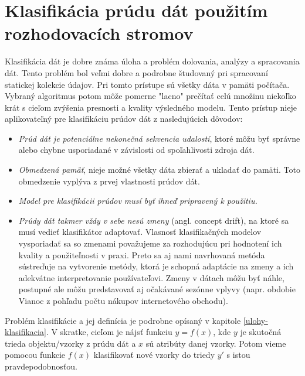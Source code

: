 \chapter{Klasifikácia prúdu dát použitím rozhodovacích stromov}
\label{Klasifikácia prúdu dát použitím rozhodovacích stromov}


Klasifikácia dát je dobre známa úloha a problém dolovania, analýzy a spracovania dát. Tento problém bol veľmi dobre a podrobne študovaný pri spracovaní statickej kolekcie údajov. Pri tomto prístupe sú všetky dáta v pamäti počítača. Vybraný algoritmus potom môže pomerne "lacno" prečítať celú množinu niekoľko krát s cieľom zvýšenia presnosti a kvality výsledného modelu. Tento prístup nieje aplikovateľný pre klasifikáciu prúdov dát z nasledujúcich dôvodov:

\begin{itemize}
	\item \textit{Prúd dát je potenciálne nekonečná sekvencia udalostí}, ktoré môžu byť správne alebo chybne usporiadané v závislosti od spoľahlivosti zdroja dát.
	\item \textit{Obmedzená pamäť}, nieje možné všetky dáta zbierať a ukladať do pamäti. Toto obmedzenie vyplýva z prvej vlastnosti prúdov dát.
	\item \textit{Model pre klasifikácii prúdov musí byť ihneď pripravený k použitiu.} 
	\item \textit{Prúdy dát takmer vždy v sebe nesú zmeny} (angl. concept drift), na ktoré sa musí vedieť klasifikátor adaptovať. Vlasnosť klasifikačných modelov vysporiadať sa so zmenami považujeme za rozhodujúcu pri hodnotení ich kvality a použiteľnosti v praxi. Preto sa aj nami navrhovaná metóda sústreďuje na vytvorenie metódy, ktorá je schopná adaptácie na zmeny a ich adekvátne interpretovanie používateľovi. Zmeny v dátach môžu byť náhle, postupné ale môžu predstavovať aj očakávané sezónne vplyvy (napr. obdobie Vianoc z pohľadu počtu nákupov internetového obchodu).
\end{itemize}

Problém klasifikácie a jej definícia je podrobne opísaný v kapitole \ref{ulohy-klasifikacia}. V skratke, cieľom je nájsť funkciu $y = f(x)$, kde $y$ je skutočná trieda objektu/vzorky z prúdu dát a $x$ sú atribúty danej vzorky. Potom vieme pomocou funkcie $f(x)$ klasifikovať nové vzorky do triedy $y'$ s istou pravdepodobnosťou.

\par

